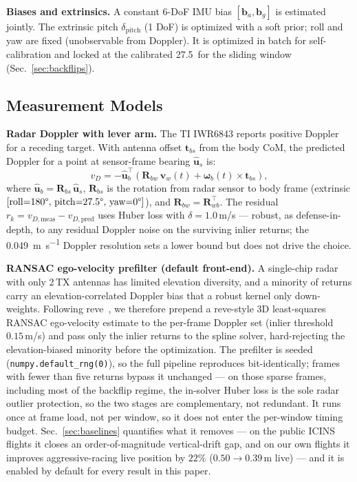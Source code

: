 \documentclass[conference]{IEEEtran}
\newcommand{\vR}{\mathbf{R}}
\newcommand{\vv}{\mathbf{v}}
\newcommand{\vom}{\boldsymbol{\omega}}
\newcommand{\vu}{\hat{\mathbf{u}}}
\newcommand{\vb}{\mathbf{b}}
\begin{document}
\textbf{Biases and extrinsics.}
A constant 6-DoF IMU bias $[\vb_a, \vb_g]$ is estimated jointly.
The extrinsic pitch $\delta_\text{pitch}$ (1 DoF) is optimized
with a soft prior; roll and yaw are fixed (unobservable from
Doppler).  It is optimized in batch for self-calibration and locked at
the calibrated 27.5\degree\ for the sliding window
(Sec.~\ref{sec:backflips}).

\subsection{Measurement Models}
\label{sec:models}

\textbf{Radar Doppler with lever arm.}
The TI IWR6843 reports positive Doppler for a receding target.
With antenna offset $\mathbf{t}_{bs}$ from the body CoM, the
predicted Doppler for a point at sensor-frame bearing $\vu_s$ is:
\begin{equation}
  v_D = -\vu_b^{\top}\!\left(
    \vR_{bw}\,\vv_w(t) + \vom_b(t) \times \mathbf{t}_{bs}
  \right),
  \label{eq:doppler}
\end{equation}
where $\vu_b = \vR_{bs}\,\vu_s$, $\vR_{bs}$ is the rotation from
radar sensor to body frame (extrinsic $[\text{roll}{=}180\degree,\,
\text{pitch}{=}27.5\degree,\,\text{yaw}{=}0\degree]$), and
$\vR_{bw} = \vR_{wb}^{\top}$.  The residual
$r_k = v_{D,\text{meas}} - v_{D,\text{pred}}$ uses Huber
loss with $\delta = 1.0$\,m/s --- robust, as defense-in-depth, to any
residual Doppler noise on the surviving inlier returns; the
\SI{0.049}{\metre\per\second} Doppler resolution sets a lower bound but
does not drive the choice.

\textbf{RANSAC ego-velocity prefilter (default front-end).}
A single-chip radar with only 2\,TX antennas has limited elevation
diversity, and a minority of returns carry an elevation-correlated
Doppler bias that a robust kernel only down-weights.  Following
reve~\cite{doer2020ekf}, we therefore prepend a reve-style 3D
least-squares RANSAC ego-velocity estimate to the per-frame Doppler set
(inlier threshold $0.15$\,m/s) and pass only the inlier returns to the
spline solver, hard-rejecting the elevation-biased minority before the
optimization.  The prefilter is seeded
(\texttt{numpy.default\_rng(0)}), so the full pipeline reproduces
bit-identically; frames with fewer than five returns bypass it
unchanged --- on those sparse frames, including most of the backflip
regime, the in-solver Huber loss is the sole radar outlier protection,
so the two stages are complementary, not redundant.  It runs once at
frame load, not per window, so it does not
enter the per-window timing budget.  Sec.~\ref{sec:baselines} quantifies
what it removes --- on the public ICINS flights it closes an
order-of-magnitude vertical-drift gap, and on our own flights it
improves aggressive-racing live position by $22\%$ ($0.50\to0.39$\,m
live) --- and it is enabled by default for every result in this paper.
\end{document}

